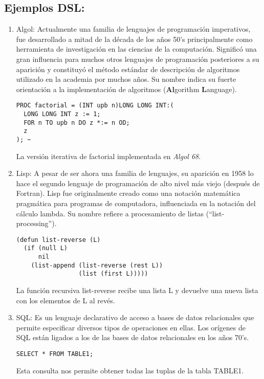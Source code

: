 \documentclass[12pt]{article}
\begin{document}
\subsection*{Ejemplos DSL:}
\begin{enumerate}
\item Algol: Actualmente una familia de lenguajes de programación imperativos, fue desarrollado a mitad de la década de los años 50's principalmente como herramienta de investigación en las ciencias de la computación. Significó una gran influencia para muchos otros lenguajes de programación posteriores a su aparición y constituyó el método estándar de descripción de algoritmos utilizado en la academia por muchos años. Su nombre indica su fuerte orientación a la implementación de algoritmos (\textbf{Al}gorithm \textbf{L}anguage).
\begin{verbatim}
PROC factorial = (INT upb n)LONG LONG INT:(
  LONG LONG INT z := 1;
  FOR n TO upb n DO z *:= n OD;
  z
); ~
\end{verbatim}
  La versión iterativa de factorial implementada en \textit{Algol 68}.
\item Lisp: A pesar de ser ahora una familia de lenguajes, su aparición en 1958 lo hace el segundo lenguaje de programación de alto nivel más viejo (después de Fortran). Lisp fue originalmente creado como una notación matemática pragmática para programas de computadora, influenciada en la notación del cálculo lambda. Su nombre refiere a procesamiento de listas (``list-processing'').
\begin{verbatim}
(defun list-reverse (L)
  (if (null L)
      nil
    (list-append (list-reverse (rest L)) 
                 (list (first L)))))
\end{verbatim} 
La función recursiva list-reverse recibe una lista L y devuelve una nueva lista con los elementos de L al revés.
\item SQL: Es un lenguaje declarativo de acceso a bases de datos relacionales que permite especificar diversos tipos de operaciones en ellas.
  Los orígenes de SQL están ligados a los de las bases de datos relacionales en los años 70's.
\begin{verbatim}
SELECT * FROM TABLE1;
\end{verbatim}
Esta consulta nos permite obtener todas las tuplas de la tabla TABLE1.
\end{enumerate}
    
\end{document}
